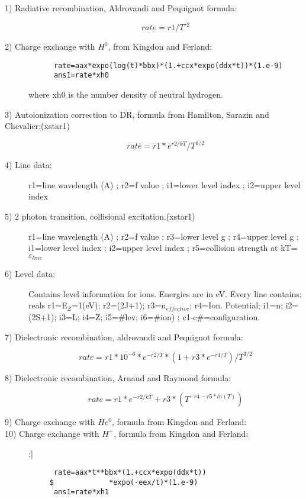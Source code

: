 \begin{description}

\item[1) Radiative recombination, Aldrovandi and Pequignot formula:]
 $$rate=r1/T^{r2}$$

\item[2) Charge exchange with $H^0$, from Kingdon and Ferland:]

\begin{verbatim}
      rate=aax*expo(log(t)*bbx)*(1.+ccx*expo(ddx*t))*(1.e-9)
      ans1=rate*xh0
\end{verbatim}

where xh0 is the number density of neutral hydrogen.

\item[3) Autoionization correction to DR, formula from Hamilton, Sarazin 
and Chevalier:(xstar1)]
 $$rate=r1*e^{r2/kT}/T^{1/2}$$

\item[4) Line data:]
 r1=line wavelength (A)
; r2=f value
; i1=lower level index
; i2=upper level index

\item[5) 2 photon transition, collisional excitation.(xstar1)]
 r1=line wavelength (A)
; r2=f value
; r3=lower level g
; r4=upper level g
; i1=lower level index
; i2=upper level index
; r5=collision strength at kT= $\varepsilon_{line}$

\item[6) Level data:]
 Contains level information for ions. Energies are in eV.      
 Every line  contains:
 reals r1=E$_Z$=1(eV); r2=(2J+1); r3=n$_{effective}$; r4=Ion. Potential;
i1=n; i2=(2S+1); i3=L; i4=Z; i5=$\#$lev; i6=$\#$ion)
; c1-c$\#$=configuration.

\item[7) Dielectronic recombination, aldrovandi and Pequignot formula:]
 $$rate=r1*10^{-6}*e^{-r2/T}*(1+r3*e^{-r4/T})/T^{3/2}$$

\item[8) Dielectronic recombination, Arnaud and Raymond formula:]
 $$rate=r1*e^{-r2/kT} + r3*(T^{-r4-r5*ln(T)})$$

\item[9) Charge exchange with $He^0$, formula from Kingdon and Ferland:]


\item[10) Charge exchange with $H^+$, formula from Kingdon and Ferland:]:]                            
\begin{verbatim}
      rate=aax*t**bbx*(1.+ccx*expo(ddx*t))
     $             *expo(-eex/t)*(1.e-9)
      ans1=rate*xh1
\end{verbatim}
 


\end{description}

